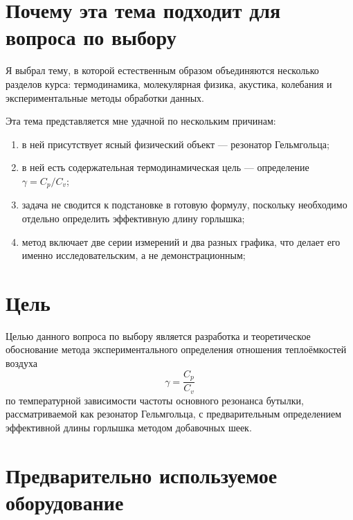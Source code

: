 \documentclass[a4paper,12pt]{article}
\begin{document}
	
	\section*{Почему эта тема подходит для вопроса по выбору}
	
	Я выбрал тему, в которой естественным образом объединяются несколько разделов курса: термодинамика, молекулярная физика, акустика, колебания и экспериментальные методы обработки данных.
	
	Эта тема представляется мне удачной по нескольким причинам:
	\begin{enumerate}[label=\arabic*)]
		\item в ней присутствует ясный физический объект --- резонатор Гельмгольца;
		\item в ней есть содержательная термодинамическая цель --- определение \(\gamma=C_p/C_v\);
		\item задача не сводится к подстановке в готовую формулу, поскольку необходимо отдельно определить эффективную длину горлышка;
		\item метод включает две серии измерений и два разных графика, что делает его именно исследовательским, а не демонстрационным;
		
	\end{enumerate}
	
	\section*{Цель}
	
	Целью данного вопроса по выбору является разработка и теоретическое обоснование метода экспериментального определения отношения теплоёмкостей воздуха
	\[
	\gamma=\frac{C_p}{C_v}
	\]
	по температурной зависимости частоты основного резонанса бутылки, рассматриваемой как резонатор Гельмгольца, с предварительным определением эффективной длины горлышка методом добавочных шеек.
	
	\section*{Предварительно используемое оборудование}
	
\end{document}
